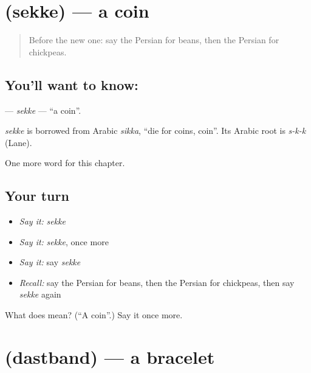 \section[\texorpdfstring{\fa{سکه} (sekke)}{سکه (sekke)}]{ (sekke) — a coin}

\label{lesson:FA-C119-sekke}



\begin{quote}
Before the new one: say the Persian for beans, then the Persian for chickpeas.
\end{quote}

\subsection*{You'll want to know: }
\textbf{} — \emph{sekke} — \textquotedblleft{}a coin\textquotedblright{}.

\begin{cousinweb}
\emph{sekke} is borrowed from Arabic \emph{sikka}, \textquotedblleft{}die for coins, coin\textquotedblright{}. Its Arabic root is \emph{s-k-k} (Lane).
\end{cousinweb}

\begin{grammarlens}[title={What you've built}]
One more word for this chapter.
\end{grammarlens}

\subsection*{Your turn}
\begin{itemize}
\raggedright
  \item \emph{Say it:} \emph{sekke}
  \item \emph{Say it:} \emph{sekke}, once more
  \item \emph{Say it:} say \emph{sekke}
  \item \emph{Recall:} say the Persian for beans, then the Persian for chickpeas, then say \emph{sekke} again
\end{itemize}

\begin{tcolorbox}[breakable,colback=teal!4,colframe=teal!35!black,title={Before you move on}]
What does  mean? (\textquotedblleft{}A coin\textquotedblright{}.) Say it once more.
\end{tcolorbox}
\section[\texorpdfstring{\fa{دستبند} (dastband)}{دستبند (dastband)}]{ (dastband) — a bracelet}

